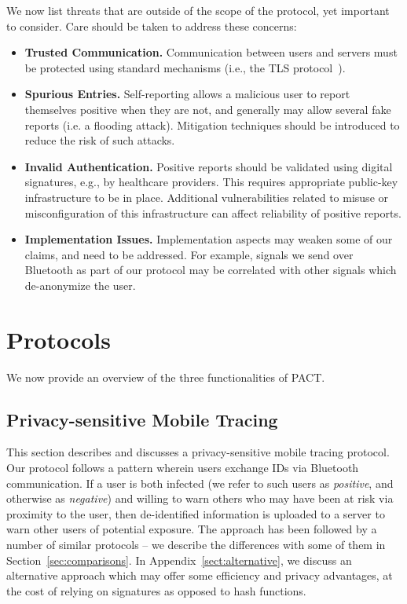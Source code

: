 We now list threats that are outside of the scope of the protocol, yet important to consider. Care should be taken to address these concerns:
\begin{itemize}
    \item {\bf Trusted Communication.} Communication between users and servers must be protected using standard mechanisms (i.e., the TLS protocol~\cite{TLS}).
    \item {\bf Spurious Entries.} Self-reporting allows a malicious user to report themselves positive when they are not, and generally may allow several fake reports (i.e. a flooding attack). Mitigation techniques should be introduced to reduce the risk of such attacks.  
    \item {\bf Invalid Authentication.} Positive reports should be validated using digital signatures, e.g., by healthcare providers. This requires appropriate public-key infrastructure to be in place. Additional vulnerabilities related to misuse or misconfiguration of this infrastructure can affect reliability of positive reports.
 \item {\bf Implementation Issues.} Implementation aspects may weaken some of our claims, and need to be addressed. For example, signals we send over Bluetooth as part of our protocol may be correlated with other signals which de-anonymize the user. 
   
    
\end{itemize}

\section{Protocols} 
We now provide an overview of the three functionalities of PACT.


\subsection{Privacy-sensitive Mobile Tracing} \label{sect:Bluetooth}

This section describes and discusses a privacy-sensitive mobile tracing protocol. Our protocol follows a pattern wherein users exchange IDs via Bluetooth communication.   If a user is both infected (we refer to such users as {\em positive}, and otherwise as {\em negative}) and willing to warn others who may have been at risk via proximity to the user, then de-identified information is uploaded to a server to warn other users of potential exposure. The approach has been followed by a number of similar protocols -- we describe the differences with some of them in Section~\ref{sec:comparisons}. In Appendix~\ref{sect:alternative}, we discuss an alternative approach which may offer some efficiency and privacy advantages, at the cost of relying on signatures as opposed to hash functions. 


